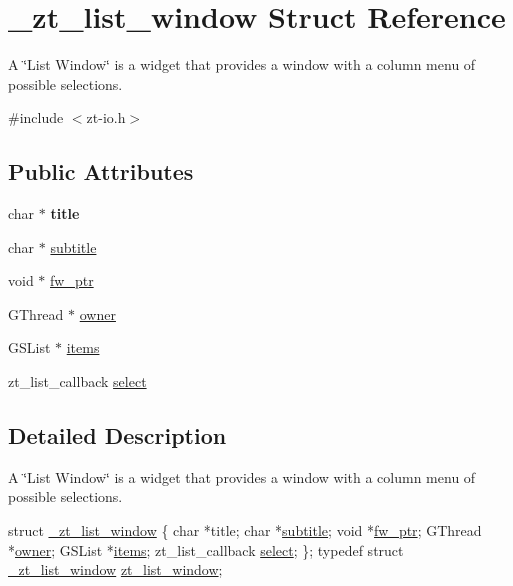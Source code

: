 \hypertarget{struct__zt__list__window}{\section{\-\_\-zt\-\_\-list\-\_\-window Struct Reference}
\label{struct__zt__list__window}
}


A \char`\"{}\-List Window\char`\"{} is a widget that provides a window with a column menu of possible selections.  




{\ttfamily \#include $<$zt-\/io.\-h$>$}

\subsection*{Public Attributes}
\begin{DoxyCompactItemize}
\item 
\hypertarget{struct__zt__list__window_a8f04e530694361ccb476c22317e69d87}{char $\ast$ {\bfseries title}}\label{struct__zt__list__window_a8f04e530694361ccb476c22317e69d87}

\item 
char $\ast$ \hyperlink{struct__zt__list__window_a395256e9302e9a5f0391087993a1c54a}{subtitle}
\item 
void $\ast$ \hyperlink{struct__zt__list__window_aec269353bfb6e2db7a1fa17cb9e5635b}{fw\-\_\-ptr}
\item 
G\-Thread $\ast$ \hyperlink{struct__zt__list__window_ac035ebdcaffbbd822e25b6c57853987c}{owner}
\item 
G\-S\-List $\ast$ \hyperlink{struct__zt__list__window_a73b3993928a8c0e9669f4a547e0bb1f4}{items}
\item 
zt\-\_\-list\-\_\-callback \hyperlink{struct__zt__list__window_ad05058c977ef71bd963ccb5e95d3d527}{select}
\end{DoxyCompactItemize}


\subsection{Detailed Description}
A \char`\"{}\-List Window\char`\"{} is a widget that provides a window with a column menu of possible selections. 


\begin{DoxyCode}
\textcolor{keyword}{struct }\hyperlink{struct__zt__list__window}{\_zt\_list\_window} \{
    \textcolor{keywordtype}{char} *title;       
    \textcolor{keywordtype}{char} *\hyperlink{struct__zt__list__window_a395256e9302e9a5f0391087993a1c54a}{subtitle};     
    \textcolor{keywordtype}{void} *\hyperlink{struct__zt__list__window_aec269353bfb6e2db7a1fa17cb9e5635b}{fw\_ptr};       
    GThread *\hyperlink{struct__zt__list__window_ac035ebdcaffbbd822e25b6c57853987c}{owner};     
    GSList *\hyperlink{struct__zt__list__window_a73b3993928a8c0e9669f4a547e0bb1f4}{items};      
    zt\_list\_callback  \hyperlink{struct__zt__list__window_ad05058c977ef71bd963ccb5e95d3d527}{select};
\};
\textcolor{keyword}{typedef} \textcolor{keyword}{struct }\hyperlink{struct__zt__list__window}{\_zt\_list\_window} \hyperlink{struct__zt__list__window}{zt\_list\_window};
\end{DoxyCode}
 

